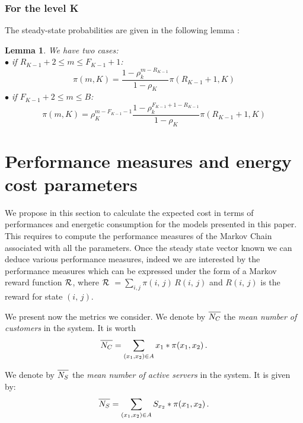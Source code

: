 \documentclass[conference]{IEEEtran}
\newtheorem{lem}{Lemma}
\begin{document}
\subsubsection{For the level K}
The steady-state probabilities are given in the following lemma : \\
\begin{lem} 
We have two cases:\\
$\bullet$ if $R_{K-1}+2 \leq m \leq F_{K-1}+1 $:
\begin{equation}
\pi(m,K)=\frac{1-\rho_k^{m-R_{K-1}}}{1-\rho_K} \pi(R_{K-1}+1,K)
\label{eq60}
\end{equation}
$\bullet$ if $F_{K-1}+2 \leq m \leq B$:
\begin{equation}
\pi(m,K)=\rho_K^{m-F_{K-1}-1} \frac{1-\rho_k^{F_{K-1}+1-R_{K-1}}}{1-\rho_K} \pi(R_{K-1}+1,K)
\label{eq61}
\end{equation}
\end{lem}


\section{Performance measures and energy cost parameters}
\label{sec:ParamPerf}

We propose in this section to calculate the expected cost in terms of performances and energetic consumption
for the models presented in this paper. This requires to compute the performance measures of the Markov Chain associated with
all the parameters. Once the steady state vector known we can deduce various performance measures, indeed 
we are interested by the performance measures which can be expressed under the form of a Markov reward 
function $\cal{R}$, where $\cal{R}$ $=\sum_{i,j}\pi(i,\,j) \,R(i,\,j)$  and $R(i,\,j)$ is the reward for state $(i,\,j)$.
 
We present now the metrics we consider.
We denote by $\overline{\mathstrut N_{C}}$ 
the \emph{mean number of customers} in the system. It is worth
\begin{equation}
\overline{\mathstrut N_{C}}=\sum_{(x_{1},x_{2}) \in A}x_{1}*\pi(x_{1},x_{2}) \, .
\end{equation}

We denote by $\overline{\mathstrut N_{S}}$ the \emph{mean number of active servers} in the system.
It is given by:
\begin{equation}
\overline{\mathstrut N_{S}}=\sum_{(x_{1},x_{2}) \in A}S_{x_{2}}*\pi(x_{1},x_{2}) \, .
\end{equation}
\end{document}

